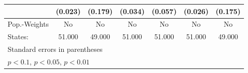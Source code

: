 {\begin{tabular}{l*{6}{c}}
            &     (0.023)         &     (0.179)         &     (0.034)         &     (0.057)         &     (0.026)         &     (0.175)         \\
\hline
Pop.-Weights&          No         &          No         &          No         &          No         &          No         &          No         \\
States:     &      51.000         &      49.000         &      51.000         &      51.000         &      51.000         &      49.000         \\
\hline\hline
\multicolumn{7}{l}{\footnotesize Standard errors in parentheses}\\
\multicolumn{7}{l}{\footnotesize \sym{*} \(p<0.1\), \sym{**} \(p<0.05\), \sym{***} \(p<0.01\)}\\
\end{tabular}
}
